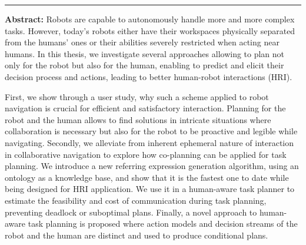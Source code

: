 \documentclass[english,a4paper,11pt,twoside]{StyleThese}
\begin{document}
\cleardoublepage
\begin{vcenterpage}
\noindent\rule[2pt]{\textwidth}{0.5pt}

\textbf{Abstract:}
Robots are capable to autonomously handle more and more complex tasks. However, today's robots either have their workspaces physically separated from the humans' ones or their abilities severely restricted when acting near humans. In this thesis, we investigate several approaches allowing to plan not only for the robot but also for the human, enabling to predict and elicit their decision process and actions, leading to better human-robot interactions (HRI). 

First, we show through a user study, why such a scheme applied to robot navigation is crucial for efficient and satisfactory interaction. Planning for the robot and the human allows to find solutions in intricate situations where collaboration is necessary but also for the robot to be proactive and legible while navigating. Secondly, we alleviate from inherent ephemeral nature of interaction in collaborative navigation to explore how co-planning can be applied for task planning. We introduce a new referring expression generation algorithm, using an ontology as a knowledge base, and show that it is the fastest one to date while being designed for HRI application. We use it in a human-aware task planner to estimate the feasibility and cost of communication during task planning, preventing deadlock or suboptimal plans. Finally, a novel approach to human-aware task planning is proposed where action models and decision streams of the robot and the human are distinct and used to produce conditional plans.
\begin{comment}
As technology progresses, more and more complex tasks can be automated. However, robots seldom consider the nearby humans in their decision making processes. This results in today robots usage to be separated from human environment or to be overdefensive when evolving close to humans. We claim that bringing the robot and the human workspace closer would allow to use their complementarity to perform more complex tasks in collaboration, more efficiently and with more satisfaction for the human.


\end{comment}
\end{vcenterpage}
\end{document}

